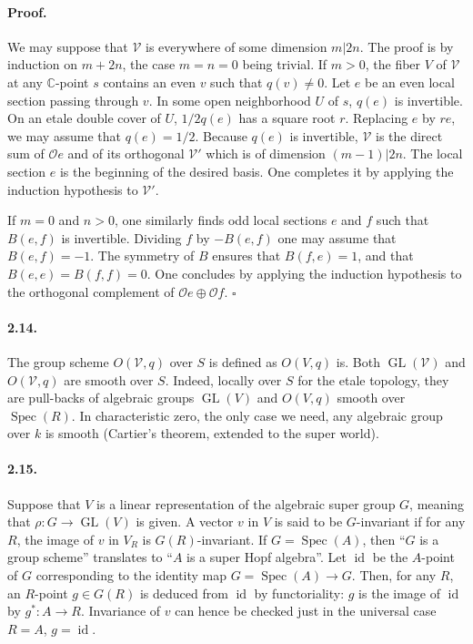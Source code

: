 \documentclass[11pt]{article}
\newcommand{\C}{\mathbb C}
\newcommand{\Spec}{\operatorname{Spec}}
\newcommand{\GL}{\operatorname{GL}}
\newcommand{\id}{\operatorname{id}}
\newcommand{\calO}{\mathcal O}
\begin{document}
\paragraph{Proof.}
We may suppose that $\mathcal V$ is everywhere of some dimension $m|2n$. The proof is by induction on $m+2n$, the case $m=n=0$ being trivial. If $m>0$, the fiber $V$ of $\mathcal V$ at any $\C$-point $s$ contains an even $v$ such that $q(v)\ne0$. Let $e$ be an even local section passing through $v$. In some open neighborhood $U$ of $s$, $q(e)$ is invertible. On an etale double cover of $U$, $1/2q(e)$ has a square root $r$. Replacing $e$ by $re$, we may assume that $q(e)=1/2$. Because $q(e)$ is invertible, $\mathcal V$ is the direct sum of $\calO e$ and of its orthogonal $\mathcal V'$ which is of dimension $(m-1)|2n$. The local section $e$ is the beginning of the desired basis. One completes it by applying the induction hypothesis to $\mathcal V'$.

If $m=0$ and $n>0$, one similarly finds odd local sections $e$ and $f$ such that $B(e,f)$ is invertible. Dividing $f$ by $-B(e,f)$ one may assume that $B(e,f)=-1$. The symmetry of $B$ ensures that $B(f,e)=1$, and that $B(e,e)=B(f,f)=0$. One concludes by applying the induction hypothesis to the orthogonal complement of $\calO e\oplus\calO f$. \hfill $\square$

\paragraph{2.14.}
The group scheme $O(\mathcal V,q)$ over $S$ is defined as $O(V,q)$ is. Both $\GL(\mathcal V)$ and $O(\mathcal V,q)$ are smooth over $S$. Indeed, locally over $S$ for the etale topology, they are pull-backs of algebraic groups $\GL(V)$ and $O(V,q)$ smooth over $\Spec(R)$. In characteristic zero, the only case we need, any algebraic group over $k$ is smooth (Cartier's theorem, extended to the super world).

\paragraph{2.15.}
Suppose that $V$ is a linear representation of the algebraic super group $G$, meaning that $\rho:G\to\GL(V)$ is given. A vector $v$ in $V$ is said to be $G$-invariant if for any $R$, the image of $v$ in $V_R$ is $G(R)$-invariant. If $G=\Spec(A)$, then ``$G$ is a group scheme'' translates to ``$A$ is a super Hopf algebra''. Let $\id$ be the $A$-point of $G$ corresponding to the identity map $G=\Spec(A)\to G$. Then, for any $R$, an $R$-point $g\in G(R)$ is deduced from $\id$ by functoriality: $g$ is the image of $\id$ by $g^*:A\to R$. Invariance of $v$ can hence be checked just in the universal case $R=A$, $g=\id$.
\end{document}
